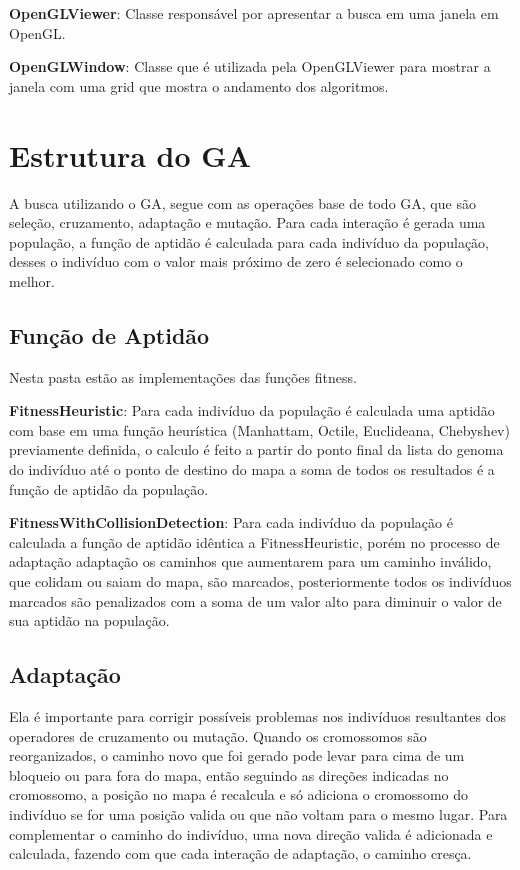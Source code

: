  \textbf{OpenGLViewer}: Classe responsável por apresentar a busca em uma janela em OpenGL.
 
 \textbf{OpenGLWindow}: Classe que é utilizada pela OpenGLViewer para mostrar a janela com uma grid que mostra o andamento dos algoritmos.
 
 \section{Estrutura do GA}
 
 A busca utilizando o GA, segue com as operações base de todo GA, que são seleção, cruzamento, adaptação e mutação. 
 Para cada interação é gerada uma população, a função de aptidão é calculada para cada indivíduo da população, 
 desses o indivíduo com o valor mais próximo de zero é selecionado como o melhor.
 
 \subsection{Função de Aptidão}
 
 Nesta pasta estão as implementações das funções fitness.
 
 \textbf{FitnessHeuristic}: Para cada indivíduo da população é calculada uma aptidão com base em uma função heurística (Manhattam, Octile, Euclideana, Chebyshev)
 previamente definida, o calculo é feito a partir do ponto final da lista do genoma do indivíduo até o ponto de destino do mapa
 a soma de todos os resultados é a função de aptidão da população.
 
 \textbf{FitnessWithCollisionDetection}: Para cada indivíduo da população é calculada a função de aptidão idêntica a FitnessHeuristic, porém no processo de adaptação adaptação os caminhos que aumentarem para um caminho inválido, que colidam ou saiam do mapa, são marcados,
 posteriormente todos os indivíduos marcados são penalizados com a  soma de  um valor alto para diminuir o valor de sua aptidão na população.
 
 \subsection{Adaptação}
 
 Ela é importante para corrigir possíveis problemas nos indivíduos resultantes dos operadores de cruzamento ou mutação. Quando os cromossomos são reorganizados, 
 o caminho novo que foi gerado pode levar para cima de um bloqueio ou para fora do mapa, então seguindo as direções indicadas no cromossomo, 
 a posição no mapa é recalcula e só adiciona o cromossomo do indivíduo se for uma posição valida ou que não voltam para o mesmo lugar.
 Para complementar o caminho do indivíduo, uma nova direção valida é adicionada e calculada, fazendo com que cada interação de adaptação, o caminho cresça.
 
